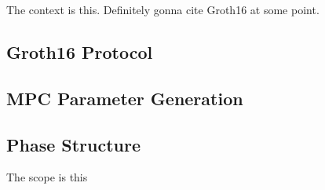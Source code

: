 
The context is this. Definitely gonna cite Groth16 \cite{groth16} at some point.
\subsection{Groth16 Protocol}

\subsection{MPC Parameter Generation}

\subsection{Phase Structure}


The scope is this